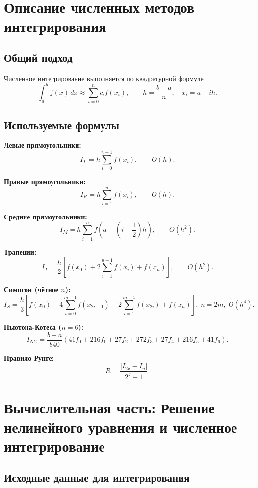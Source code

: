 \documentclass[a4paper,12pt]{article}
\begin{document}
\newpage

\section{Описание численных методов интегрирования}

\subsection{Общий подход}

Численное интегрирование выполняется по квадратурной формуле
\[
\int_a^b f(x)\,dx \approx \sum_{i=0}^{n} c_i f(x_i),
\qquad h=\frac{b-a}{n}, \quad x_i=a+ih.
\]

\subsection{Используемые формулы}

\textbf{Левые прямоугольники:}
\[
I_L = h\sum_{i=0}^{n-1}f(x_i), \qquad O(h).
\]

\textbf{Правые прямоугольники:}
\[
I_R = h\sum_{i=1}^{n}f(x_i), \qquad O(h).
\]

\textbf{Средние прямоугольники:}
\[
I_M = h\sum_{i=1}^{n}f\left(a+\left(i-\frac12\right)h\right), \qquad O(h^2).
\]

\textbf{Трапеции:}
\[
I_T = \frac{h}{2}\left[f(x_0)+2\sum_{i=1}^{n-1}f(x_i)+f(x_n)\right], \qquad O(h^2).
\]

\textbf{Симпсон (чётное $n$):}
\[
I_S = \frac{h}{3}\left[f(x_0)+4\sum_{i=0}^{m-1}f(x_{2i+1})+2\sum_{i=1}^{m-1}f(x_{2i})+f(x_n)\right],\; n=2m,\; O(h^4).
\]

\textbf{Ньютона-Котеса ($n=6$):}
\[
I_{NC}=\frac{b-a}{840}(41f_0+216f_1+27f_2+272f_3+27f_4+216f_5+41f_6).
\]

\textbf{Правило Рунге:}
\[
R=\frac{|I_{2n}-I_n|}{2^k-1}.
\]

\newpage

\section{Вычислительная часть: Решение нелинейного уравнения и численное интегрирование}

\subsection{Исходные данные для интегрирования}
\end{document}
